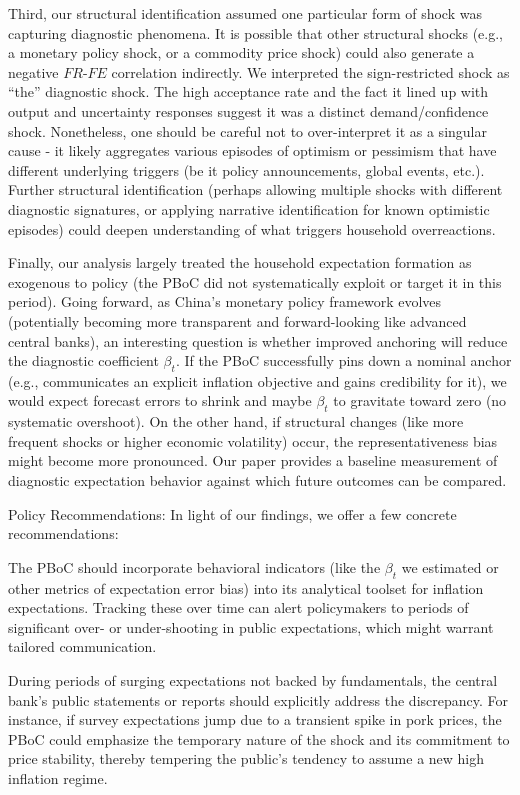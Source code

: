 \documentclass[12pt]{article}
\begin{document}
Third, our structural identification assumed one particular form of shock was capturing diagnostic phenomena. It is possible that other structural shocks (e.g., a monetary policy shock, or a commodity price shock) could also generate a negative $FR$-$FE$ correlation indirectly. We interpreted the sign-restricted shock as “the” diagnostic shock. The high acceptance rate and the fact it lined up with output and uncertainty responses suggest it was a distinct demand/confidence shock. Nonetheless, one should be careful not to over-interpret it as a singular cause - it likely aggregates various episodes of optimism or pessimism that have different underlying triggers (be it policy announcements, global events, etc.). Further structural identification (perhaps allowing multiple shocks with different diagnostic signatures, or applying narrative identification for known optimistic episodes) could deepen understanding of what triggers household overreactions.

Finally, our analysis largely treated the household expectation formation as exogenous to policy (the PBoC did not systematically exploit or target it in this period). Going forward, as China's monetary policy framework evolves (potentially becoming more transparent and forward-looking like advanced central banks), an interesting question is whether improved anchoring will reduce the diagnostic coefficient $\beta_t$. If the PBoC successfully pins down a nominal anchor (e.g., communicates an explicit inflation objective and gains credibility for it), we would expect forecast errors to shrink and maybe $\beta_t$ to gravitate toward zero (no systematic overshoot). On the other hand, if structural changes (like more frequent shocks or higher economic volatility) occur, the representativeness bias might become more pronounced. Our paper provides a baseline measurement of diagnostic expectation behavior against which future outcomes can be compared.

Policy Recommendations: In light of our findings, we offer a few concrete recommendations:

The PBoC should incorporate behavioral indicators (like the $\beta_t$ we estimated or other metrics of expectation error bias) into its analytical toolset for inflation expectations. Tracking these over time can alert policymakers to periods of significant over- or under-shooting in public expectations, which might warrant tailored communication.

During periods of surging expectations not backed by fundamentals, the central bank's public statements or reports should explicitly address the discrepancy. For instance, if survey expectations jump due to a transient spike in pork prices, the PBoC could emphasize the temporary nature of the shock and its commitment to price stability, thereby tempering the public's tendency to assume a new high inflation regime.
\end{document}

